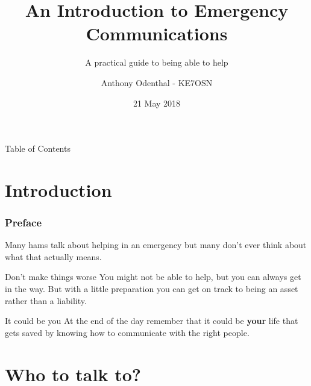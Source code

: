 \documentclass[11pt]{beamer}
\begin{document}
	\author{Anthony Odenthal - KE7OSN}
	\title{An Introduction to Emergency Communications}
	\subtitle{A practical guide to being able to help}
	\date{21 May 2018}

\begin{frame}[plain]
	\maketitle
\end{frame}

\begin{frame}{Table of Contents}
\tableofcontents
\end{frame}

\section{Introduction}

\begin{frame}
\frametitle{Preface}
Many hams talk about helping in an emergency but many don't ever think about what that actually means.
\end{frame}

\begin{frame}{Don't make things worse}
You might not be able to help, but you can always get in the way. But with a little preparation you can get on track to being an asset rather than a liability.
\end{frame}

\begin{frame}{It could be you}
At the end of the day remember that it could be \textbf{your} life that gets saved by knowing how to communicate with the right people.
\end{frame}


\section{Who to talk to?}
\end{document}
